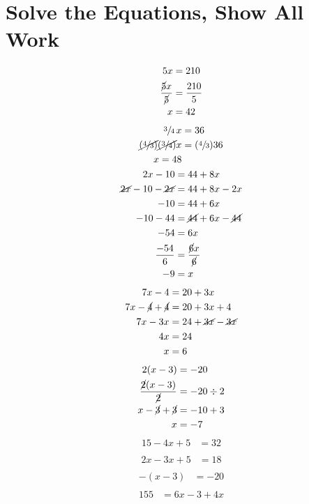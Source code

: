 \documentclass[11pt]{article} %
\begin{document}
\section{Solve the Equations, Show All Work}
\begin{align*}
5x &= 210 \\
 \frac{\cancel{5}x}{\cancel{5}} &= \frac{210}{5} \\
x&=42
\end{align*}
\begin{align*}
\sfrac{3}{4} \, x &= 36 \\
\cancel{(\sfrac{4}{3})}\cancel{(\sfrac{3}{4})}x &= (\sfrac{4}{3}) 36 \\
 x=48
\end{align*}
\begin{align*}
2x - 10 &= 44 + 8x \\
\cancel{2x} - 10 - \cancel{2x} &= 44 + 8x - 2x \\
-10 &= 44 + 6x \\
-10 - 44 &= \cancel{44}+ 6x -\cancel{44} \\
-54 &= 6x \\
\frac{-54}{6} &=\frac{\cancel{6}x}{\cancel{6}} \\
-9 &= x
\end{align*}
\begin{align*}
7x - 4 &= 20 + 3x \\
7x - {\cancel{4}}+{\cancel{4}} &= 20 + 3x + 4 \\
7x -3x &= 24 + {\cancel{3x}} - {\cancel{3x}} \\
4x &= 24 \\
x &= 6
\end{align*}
\begin{align*}
2(x-3) &= -20 \\
\frac{\cancel{2}(x - 3)}{\cancel{2}} &= -20 \div 2 \\
x - \cancel{3} + \cancel{3} &= -10 + 3 \\
x &= -7
\end{align*}
\begin{align*}
15 - 4x + 5 &= 32 \\
\end{align*}
\begin{align*}
2x - 3x + 5 &= 18 \\
\end{align*}
\begin{align*}
-(x-3) &= -20 \\
\end{align*}
\begin{align*}
155 &= 6x - 3 + 4x \\
\end{align*}
\end{document}
